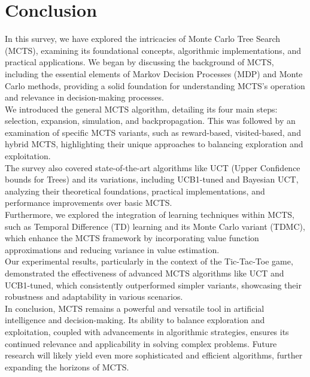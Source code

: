 \documentclass[11pt]{article}
\theoremstyle{definitionstyle}
\begin{document}
\section{Conclusion}
In this survey, we have explored the intricacies of Monte Carlo Tree Search (MCTS), examining its foundational concepts, algorithmic implementations, and practical applications. We began by discussing the background of MCTS, including the essential elements of Markov Decision Processes (MDP) and Monte Carlo methods, providing a solid foundation for understanding MCTS's operation and relevance in decision-making processes.\\
We introduced the general MCTS algorithm, detailing its four main steps: selection, expansion, simulation, and backpropagation. This was followed by an examination of specific MCTS variants, such as reward-based, visited-based, and hybrid MCTS, highlighting their unique approaches to balancing exploration and exploitation.\\
The survey also covered state-of-the-art algorithms like UCT (Upper Confidence bounds for Trees) and its variations, including UCB1-tuned and Bayesian UCT, analyzing their theoretical foundations, practical implementations, and performance improvements over basic MCTS.\\
Furthermore, we explored the integration of learning techniques within MCTS, such as Temporal Difference (TD) learning and its Monte Carlo variant (TDMC), which enhance the MCTS framework by incorporating value function approximations and reducing variance in value estimation.\\
Our experimental results, particularly in the context of the Tic-Tac-Toe game, demonstrated the effectiveness of advanced MCTS algorithms like UCT and UCB1-tuned, which consistently outperformed simpler variants, showcasing their robustness and adaptability in various scenarios.\\
In conclusion, MCTS remains a powerful and versatile tool in artificial intelligence and decision-making. Its ability to balance exploration and exploitation, coupled with advancements in algorithmic strategies, ensures its continued relevance and applicability in solving complex problems. Future research will likely yield even more sophisticated and efficient algorithms, further expanding the horizons of MCTS.


\end{document}
